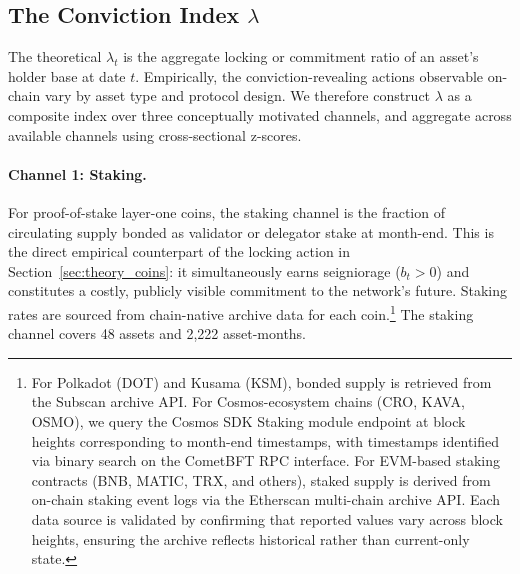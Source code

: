 \documentclass[12pt]{article}
\begin{document}
\subsection{The Conviction Index \texorpdfstring{$\lambda$}{λ}}
\label{sec:measures_lambda}

The theoretical $\lambda_t$ is the aggregate locking or commitment ratio of an asset's
holder base at date $t$. Empirically, the conviction-revealing actions observable on-chain
vary by asset type and protocol design. We therefore construct $\lambda$ as a composite
index over three conceptually motivated channels, and aggregate across available channels
using cross-sectional z-scores.

\paragraph{Channel 1: Staking.}
For proof-of-stake layer-one coins, the staking channel is the fraction of circulating
supply bonded as validator or delegator stake at month-end. This is the direct empirical
counterpart of the locking action in Section~\ref{sec:theory_coins}: it simultaneously
earns seigniorage ($b_t > 0$) and constitutes a costly, publicly visible commitment to
the network's future. Staking rates are sourced from chain-native archive data for each
coin.\footnote{For Polkadot (DOT) and Kusama (KSM), bonded supply is retrieved from the
Subscan archive API. For Cosmos-ecosystem chains (CRO, KAVA, OSMO), we query the Cosmos
SDK Staking module endpoint at block heights corresponding to month-end timestamps, with
timestamps identified via binary search on the CometBFT RPC interface. For EVM-based
staking contracts (BNB, MATIC, TRX, and others), staked supply is derived from on-chain
staking event logs via the Etherscan multi-chain archive API. Each data source is
validated by confirming that reported values vary across block heights, ensuring the
archive reflects historical rather than current-only state.} The staking channel covers
48 assets and 2,222 asset-months.
\end{document}
